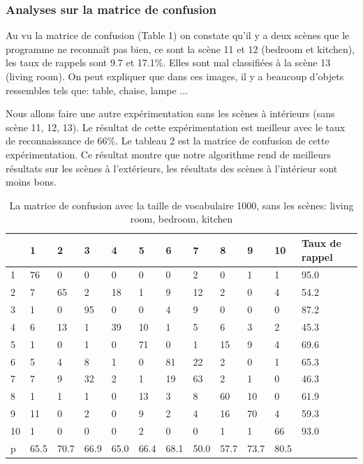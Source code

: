 \documentclass[french,12pt,a4paper,oneside,notitlepage]{report}
\begin{document}
\subsubsection{Analyses sur la matrice de confusion}
Au vu la matrice de confusion (Table 1) on constate qu'il y a deux scènes que le 
programme ne reconnaît pas bien, ce sont la scène 11 et 12 (bedroom et kitchen), les taux
de rappels sont 9.7 et 17.1\%. Elles sont mal classifiées à la scène 13 (living room). On 
peut expliquer que dans ces images, il y a beaucoup d'objets ressembles tels que: table, 
chaise, lampe ...

Nous allons faire une autre expérimentation sans les scènes à intérieurs (sans scène 11, 
12, 13). Le résultat de cette expérimentation est meilleur avec le taux de reconnaissance 
de 66\%. Le tableau 2 est la matrice de confusion de cette expérimentation. Ce résultat 
montre que notre algorithme rend de meilleurs résultats sur les scènes à l'extérieurs, 
les résultats des scènes à l'intérieur sont moins bons.

\begin{table}[!ht]
	\begin{center}
	    \begin{tabular}{|l|l|l|l|l|l|l|l|l|l|l|l|}
		  \hline
		 &1&2&3&4&5&6&7&8&9&10&Taux de rappel\\
\hline
		1&76&0&0&0&0&0&2&0&1&1&95.0\\
\hline
2&7&65&2&18&1&9&12&2&0&4&54.2\\
\hline
3&1&0&95&0&0&4&9&0&0&0&87.2\\
\hline
4&6&13&1&39&10&1&5&6&3&2&45.3\\
\hline
5&1&0&1&0&71&0&1&15&9&4&69.6\\
\hline
6&5&4&8&1&0&81&22&2&0&1&65.3\\
\hline
7&7&9&32&2&1&19&63&2&1&0&46.3\\
\hline
8&1&1&1&0&13&3&8&60&10&0&61.9\\
\hline
9&11&0&2&0&9&2&4&16&70&4&59.3\\
\hline
10&1&0&0&0&2&0&0&1&1&66&93.0\\
\hline
p&65.5&70.7&66.9&65.0&66.4&68.1&50.0&57.7&73.7&80.5&\\ 
\hline
	    \end{tabular}
	    \caption{La matrice de confusion avec la taille de vocabulaire 1000, sans les 
scènes: living room, bedroom, kitchen}
	\end{center}
\end{table}
\pagebreak
\end{document}
